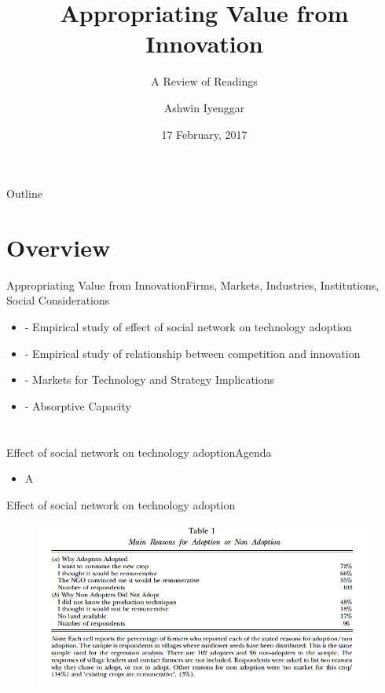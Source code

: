\documentclass{beamer}
\title{Appropriating Value from Innovation}
\subtitle{A Review of Readings}
\author{Ashwin Iyenggar}
\institute[Indian Institute of Management Bangalore] 
{
  Corporate Strategy and Policy\\
  Indian Institute of Management Bangalore
}
\date{17 February, 2017}
\begin{document}
\begin{frame}
  \titlepage
\end{frame}

\begin{frame}{Outline}
  \tableofcontents
\end{frame}

\section{Overview}
\begin{frame}{Appropriating Value from Innovation}{Firms, Markets, Industries, Institutions, Social Considerations}
\begin{itemize}
\item{\cite{Bandiera2006} - Empirical study of effect of social network on technology adoption}
\item{\cite{Aghion2005} - Empirical study of relationship between competition and innovation}
\item{\cite{Arora2001} - Markets for Technology and Strategy Implications}
\item{\cite{Cohen1990} - Absorptive Capacity}
\end{itemize}
\end{frame}



\section{\cite{Bandiera2006}}
\begin{frame}{Effect of social network on technology adoption}{Agenda}
\begin{itemize}
\item{A}
\end{itemize}
\end{frame}

\begin{frame}{Effect of social network on technology adoption}{}
\begin{figure}[h]
\begin{centering}
  \includegraphics[width=\textwidth]{01table1}
   \label{fig:01table1}
\end{centering}
\end{figure}
\end{frame}
\end{document}
